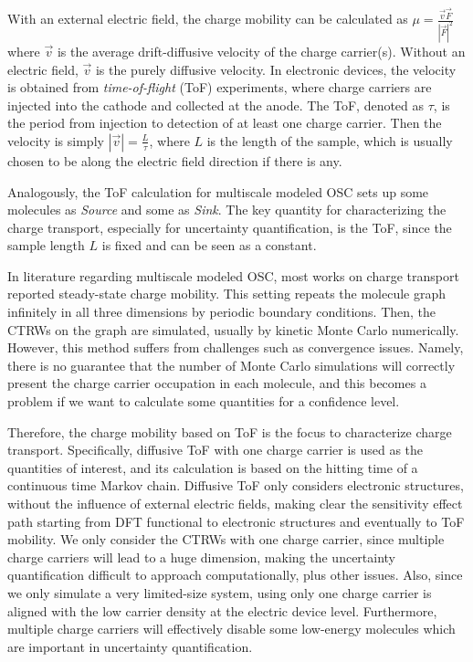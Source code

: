 \documentclass[letterpaper,12pt]{article}
\begin{document}
With an external electric field, the charge mobility can be calculated as $\mu = \frac{\vec{v} \vec{F}}{|\vec{F}|^2}$ where $\vec{v}$ is the average drift-diffusive velocity of the charge carrier(s).
Without an electric field, $\vec{v}$ is the purely diffusive velocity. 
In electronic devices, the velocity is obtained from \textit{time-of-flight} (ToF) experiments, where charge carriers are injected into the cathode and collected at the anode. The ToF, denoted as $\tau$, is the period from injection to detection of at least one charge carrier. 
Then the velocity is simply $|\vec{v}| = \frac{L}{\tau}$, where $L$ is the length of the sample, which is usually chosen to be along the electric field direction if there is any. 

Analogously, the ToF calculation for multiscale modeled OSC sets up some molecules as \textit{Source} and some as \textit{Sink}. The key quantity for characterizing the charge transport, especially for uncertainty quantification, is the ToF, since the sample length $L$ is fixed and can be seen as a constant. 

In literature regarding multiscale modeled OSC, most works on charge transport reported steady-state charge mobility. This setting repeats the molecule graph infinitely in all three dimensions by periodic boundary conditions. Then, the CTRWs on the graph are simulated, usually by kinetic Monte Carlo numerically. However, this method suffers from challenges such as convergence issues. Namely, there is no guarantee that the number of Monte Carlo simulations will correctly present the charge carrier occupation in each molecule, and this becomes a problem if we want to calculate some quantities for a confidence level. 

Therefore, the charge mobility based on ToF is the focus to characterize charge transport.
Specifically, diffusive ToF with one charge carrier is used as the quantities of interest, and its calculation is based on the hitting time of a continuous time Markov chain. 
Diffusive ToF only considers electronic structures, without the influence of external electric fields, making clear the sensitivity effect path starting from DFT functional to electronic structures and eventually to ToF mobility. 
We only consider the CTRWs with one charge carrier, since multiple charge carriers will lead to a huge dimension, making the uncertainty quantification difficult to approach computationally, plus other issues. Also, since we only simulate a very limited-size system, using only one charge carrier is aligned with the low carrier density at the electric device level. 
Furthermore, multiple charge carriers will effectively disable some low-energy molecules which are important in uncertainty quantification. 
\end{document}
